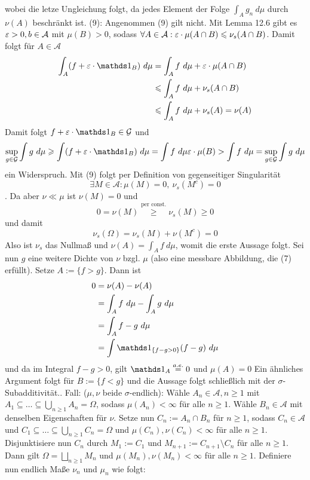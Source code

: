\documentclass[11pt]{report}
\begin{document}
     wobei die letze Ungleichung folgt, da jedes Element der Folge $\int_A g_n \ d\mu$ durch $\nu(A)$ beschr\"ankt ist.\newline\newline
     (9): Angenommen (9) gilt nicht. Mit Lemma 12.6 gibt es $\varepsilon>0,b\in\mathcal{A}$ mit $\mu(B)>0$, sodass $\forall A\in\mathcal{A}:\varepsilon\cdot \mu(A\cap B)\leqslant\nu_s(A\cap B)$. Damit folgt f\"ur $A\in\mathcal{A}$
     \begin{align*}
         \int_A (f+\eps\cdot\ind{B})\ d\mu&=\int_A f\ d\mu+\eps\cdot\mu(A\cap B)\\
         &\leq\int_A f\ d\mu+\nu_s(A\cap B) \\
         &\leq\int_A f\ d\mu+\nu_s(A)=\nu(A)
     \end{align*}
     Damit folgt $f+\eps\cdot\ind{B}\in\mathcal{G}$ und 
     $$\sup_{g\in\mathcal{G}}\int g\ d\mu\geq\int(f+\eps\cdot\ind{B})\ d\mu=\int f\ d\mu\eps\cdot\mu(B)>\int f\ d\mu=\sup_{g\in\mathcal{G}}\int g\ d\mu$$
     ein Widerspruch.
     \newline\newline
     Mit (9) folgt per Definition von gegenseitiger Singularit\"at
     $$\exists M\in\mathcal{A}:\mu(M)=0,\ \nu_s(M^c)=0$$. Da aber $\nu\ll\mu$ ist $\nu(M)=0$ und
     $$0=\nu(M)\overset{\text{per const.}}{\geq}\nu_s(M)\geq0$$
     und damit 
     $$\nu_s(\Omega)=\nu_s(M)+\nu(M^c)=0$$
     Also ist $\nu_s$ das Nullma\ss{} und $\nu(A)=\int_A f\ d\mu$, womit die erste Aussage folgt.\newline
     Sei nun $g$ eine weitere Dichte von $\nu$ bzgl. $\mu$ (also eine messbare Abbildung, die (7) erf\"ullt). Setze $A:=\{f>g\}$. Dann ist
     \begin{align*}
         0&=\nu(A)-\nu(A)\\
         &=\int_A f\ d\mu-\int_A g\ d\mu\\
         &=\int_A f-g\ d\mu \\
         &=\int\ind{\{f-g>0\}}(f-g)\ d\mu
     \end{align*}
     und da im Integral $f-g>0$, gilt $\ind{A}\overset{a.e.}{=}0$ und $\mu(A)=0$
     Ein \"ahnliches Argument folgt f\"ur $B:=\{f<g\}$ und die Aussage folgt schlie\ss{}lich mit der $\sigma$-Subadditivit\"at.\newline{}. Fall: ($\mu,\nu$ beide $\sigma$-endlich): W\"ahle $A_n\in\mathcal{A},n\geq1$ mit $A_1\subseteq\hdots\subseteq\bigcup_{n\geq1}A_n=\Omega$, sodass $\mu(A_n)<\infty$ f\"ur alle $n\geq1$. W\"ahle $B_n\in\mathcal{A}$ mit denselben Eigenschaften f\"ur $\nu$. Setze nun $C_n:=A_n\cap B_n$ f\"ur $n\geq1$, sodass $C_n\in\mathcal{A}$ und $C_1\subseteq\hdots\subseteq\bigcup_{n\geq1}C_n=\Omega$ und $\mu(C_n),\nu(C_n)<\infty$ f\"ur alle $n\geq1$. Disjunktisiere nun $C_n$ durch $M_1:=C_1$ und $M_{n+1}:=C_{n+1}\setminus C_n$ f\"ur alle $n\geq1$. Dann gilt $\Omega=\bigsqcup_{n\geq1}M_n$ und $\mu(M_n),\nu(M_n)<\infty$ f\"ur alle $n\geq1$. Definiere nun endlich Ma\ss{}e $\nu_n$ und $\mu_n$ wie folgt:
\end{document}
